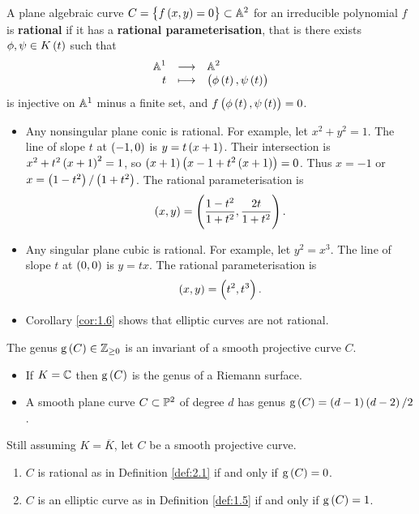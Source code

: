 \begin{definition}
\label{def:2.1}
A plane algebraic curve $ C = \cbr{f\br{x, y} = 0} \subset \AA^2 $ for an irreducible polynomial $ f $ is \textbf{rational} if it has a \textbf{rational parameterisation}, that is there exists $ \phi, \psi \in K\br{t} $ such that
$$ \function{\AA^1}{\AA^2}{t}{\br{\phi\br{t}, \psi\br{t}}} $$
is injective on $ \AA^1 $ minus a finite set, and $ f\br{\phi\br{t}, \psi\br{t}} = 0 $.
\end{definition}

\begin{example}
\hfill
\begin{itemize}
\item Any nonsingular plane conic is rational. For example, let $ x^2 + y^2 = 1 $. The line of slope $ t $ at $ \br{-1, 0} $ is $ y = t\br{x + 1} $. Their intersection is $ x^2 + t^2\br{x + 1}^2 = 1 $, so $ \br{x + 1}\br{x - 1 + t^2\br{x + 1}} = 0 $. Thus $ x = -1 $ or $ x = \br{1 - t^2} / \br{1 + t^2} $. The rational parameterisation is
$$ \br{x, y} = \br{\dfrac{1 - t^2}{1 + t^2}, \dfrac{2t}{1 + t^2}}. $$
\item Any singular plane cubic is rational. For example, let $ y^2 = x^3 $. The line of slope $ t $ at $ \br{0, 0} $ is $ y = tx $. The rational parameterisation is
$$ \br{x, y} = \br{t^2, t^3}. $$
\item Corollary \ref{cor:1.6} shows that elliptic curves are not rational.
\end{itemize}
\end{example}

\begin{remark}
\label{rem:2.3}
The genus $ \g\br{C} \in \ZZ_{\ge 0} $ is an invariant of a smooth projective curve $ C $.
\begin{itemize}
\item If $ K = \CC $ then $ \g\br{C} $ is the genus of a Riemann surface.
\item A smooth plane curve $ C \subset \PP^2 $ of degree $ d $ has genus $ \g\br{C} = \br{d - 1}\br{d - 2} / 2 $.
\end{itemize}
\end{remark}

\begin{proposition}
Still assuming $ K = \overline{K} $, let $ C $ be a smooth projective curve.
\begin{enumerate}
\item $ C $ is rational as in Definition \ref{def:2.1} if and only if $ \g\br{C} = 0 $.
\item $ C $ is an elliptic curve as in Definition \ref{def:1.5} if and only if $ \g\br{C} = 1 $.
\end{enumerate}
\end{proposition}

